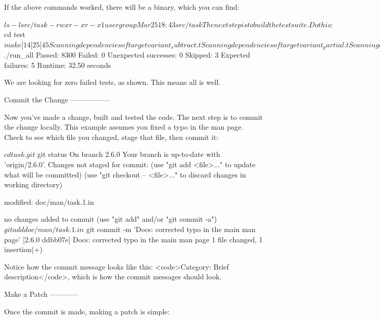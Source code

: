 \documentclass[t,handout]{beamer}
\begin{document}
If the above commands worked, there will be a binary, which you can find:

$ ls -l src/task
-rwxr-xr-x  1 user  group    Mar 25 18:43 src/task

The next step is to build the test suite. Do this:

$ cd test
$ make
[ 14%
[ 25%
[ 45%
Scanning dependencies of target variant_subtract.t
Scanning dependencies of target variant_partial.t
Scanning dependencies of target variant_or.t

...

[ 98%
[100%
[100%

Now run the test suite, which can take anywhere from 10 - 500
seconds, depending on your hardware and OS:

$ ./run_all
Passed:                          8300
Failed:                             0
Unexpected successes:               0
Skipped:                            3
Expected failures:                  5
Runtime:                        32.50 seconds

We are looking for zero failed tests, as shown.  This means all is well.

Commit the Change
-----------------

Now you've made a change, built and tested the code. The next step
is to commit the change locally. This example assumes you fixed a
typo in the man page. Check to see which file you changed, stage
that file, then commit it:

$ cd task.git
$ git status
On branch 2.6.0
Your branch is up-to-date with 'origin/2.6.0'.
Changes not staged for commit:
  (use "git add <file>..." to update what will be committed)
  (use "git checkout -- <file>..." to discard changes in working directory)

        modified:   doc/man/task.1.in

no changes added to commit (use "git add" and/or "git commit -a")
$ git add doc/man/task.1.in
$ git commit -m 'Docs: corrected typo in the main man page'
[2.6.0 ddbb07e] Docs: corrected typo in the main man page
 1 file changed, 1 insertion(+)

Notice how the commit message looks like this:
<code>Category: Brief description</code>, which is how the commit
messages should look.

Make a Patch
------------

Once the commit is made, making a patch is simple:
\end{document}
